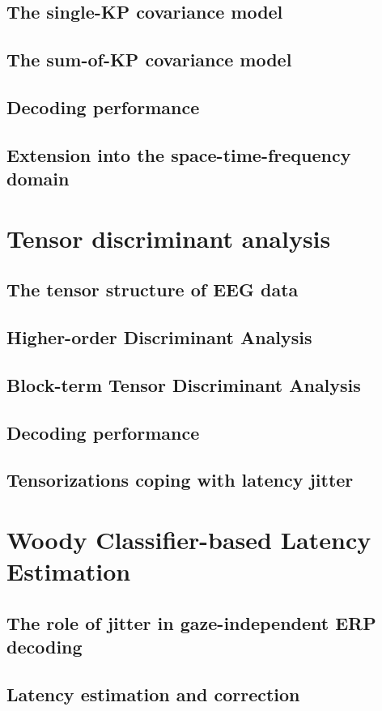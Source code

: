 \section{The single-KP covariance model}
\section{The sum-of-KP covariance model}
\section{Decoding performance}
\section{Extension into the space-time-frequency domain}

\chapter{Tensor discriminant analysis}
\section{The tensor structure of EEG data}
\section{Higher-order Discriminant Analysis}
\section{Block-term Tensor Discriminant Analysis}
\section{Decoding performance}
\section{Tensorizations coping with latency jitter}

\chapter{Woody Classifier-based Latency Estimation}
\section{The role of jitter in gaze-independent ERP decoding}
\section{Latency estimation and correction}
